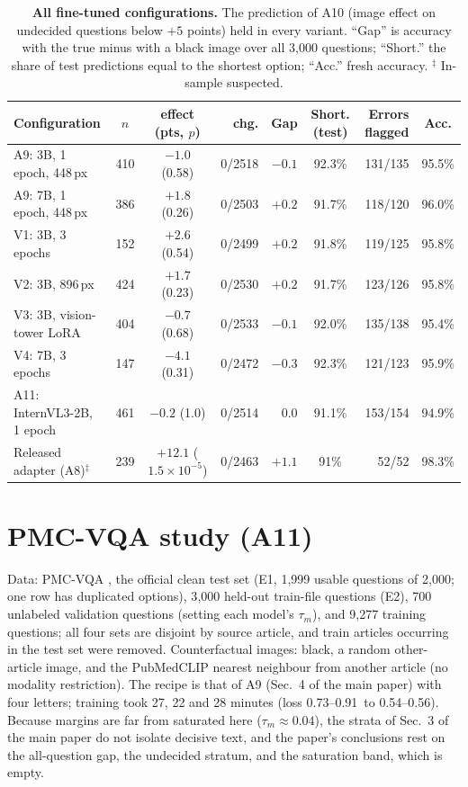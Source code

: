 \begin{table}[h]
  \centering
  \footnotesize
  \setlength{\tabcolsep}{3pt}
  \begin{tabular}{@{}lccrrcrc@{}}
    \toprule
    Configuration & \LO{} $n$ & \LO{} effect (pts, $p$) & \HI{} chg. & Gap & Short. (test) & Errors flagged & Acc. \\
    \midrule
    A9: 3B, 1 epoch, 448\,px         & 410 & $-1.0$ (0.58) & 0/2518 & $-0.1$ & 92.3\% & 131/135 & 95.5\% \\
    A9: 7B, 1 epoch, 448\,px         & 386 & $+1.8$ (0.26) & 0/2503 & $+0.2$ & 91.7\% & 118/120 & 96.0\% \\
    V1: 3B, 3 epochs                 & 152 & $+2.6$ (0.54) & 0/2499 & $+0.2$ & 91.8\% & 119/125 & 95.8\% \\
    V2: 3B, 896\,px                  & 424 & $+1.7$ (0.23) & 0/2530 & $+0.2$ & 91.7\% & 123/126 & 95.8\% \\
    V3: 3B, vision-tower LoRA        & 404 & $-0.7$ (0.68) & 0/2533 & $-0.1$ & 92.0\% & 135/138 & 95.4\% \\
    V4: 7B, 3 epochs                 & 147 & $-4.1$ (0.31) & 0/2472 & $-0.3$ & 92.3\% & 121/123 & 95.9\% \\
    A11: InternVL3-2B, 1 epoch      & 461 & $-0.2$ (1.0)  & 0/2514 & $0.0$  & 91.1\% & 153/154 & 94.9\% \\
    \midrule
    Released adapter (A8)$^\ddagger$ & 239 & $+12.1$ ($1.5\!\times\!10^{-5}$) & 0/2463 & $+1.1$ & 91\% & 52/52 & 98.3\% \\
    \bottomrule
  \end{tabular}
  \caption{\textbf{All fine-tuned configurations.} The prediction of A10 (image effect on undecided questions below $+5$ points) held in every variant. ``Gap'' is accuracy with the true minus with a black image over all 3{,}000 questions; ``Short.'' the share of test predictions equal to the shortest option; ``Acc.'' fresh accuracy. $^\ddagger$ In-sample suspected.}
  \label{tab:variants}
\end{table}

\section{PMC-VQA study (A11)}
\label{app:pmc}

Data: PMC-VQA \cite{zhang2023pmcvqa}, the official clean test set (E1, 1{,}999 usable questions of 2{,}000; one row has duplicated options), 3{,}000 held-out train-file questions (E2), 700 unlabeled validation questions (setting each model's $\tau_m$), and 9{,}277 training questions; all four sets are disjoint by source article, and train articles occurring in the test set were removed. Counterfactual images: black, a random other-article image, and the PubMedCLIP nearest neighbour from another article (no modality restriction). The recipe is that of A9 (Sec.~4 of the main paper) with four letters; training took 27, 22 and 28 minutes (loss \textrm{0.73--0.91}\ to 0.54--0.56).
Because margins are far from saturated here ($\tau_m\approx0.04$), the strata of Sec.~3 of the main paper do not isolate decisive text, and the paper's conclusions rest on the all-question gap, the undecided stratum, and the saturation band, which is empty.

